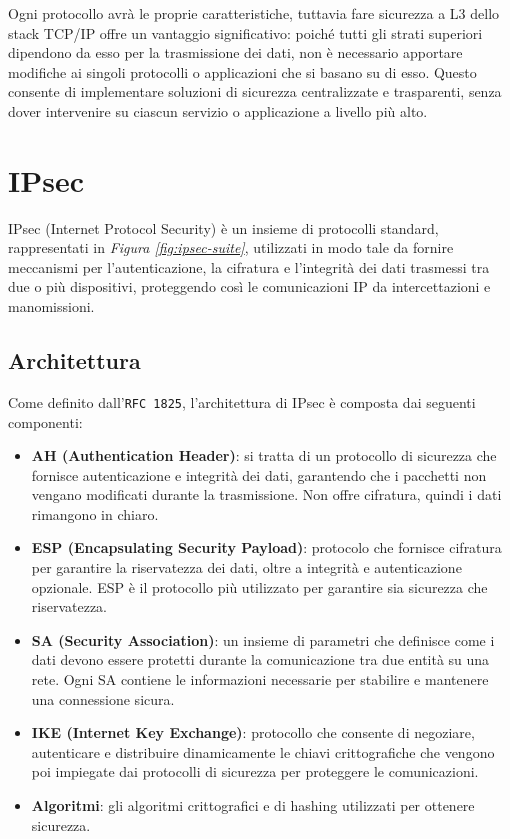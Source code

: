 \noindent
Ogni protocollo avrà le proprie caratteristiche, tuttavia fare sicurezza a L3 dello stack TCP/IP offre un vantaggio significativo:
poiché tutti gli strati superiori dipendono da esso per la trasmissione dei dati,
non è necessario apportare modifiche ai singoli protocolli o applicazioni che
si basano su di esso. Questo consente di implementare soluzioni di sicurezza
centralizzate e trasparenti, senza dover intervenire su ciascun servizio o
applicazione a livello più alto.



\section{IPsec}

IPsec (Internet Protocol Security) è un insieme di protocolli standard, rappresentati in \textit{Figura \ref{fig:ipsec-suite}}, utilizzati
in modo tale da fornire meccanismi per l'autenticazione, la cifratura e l'integrità dei dati trasmessi tra due o più
dispositivi, proteggendo così le comunicazioni IP da intercettazioni e manomissioni.

\subsection{Architettura}

Come definito dall'\texttt{RFC 1825}, l'architettura di IPsec è composta dai seguenti componenti:

\begin{itemize}
    \item \textbf{AH (Authentication Header)}: si tratta di un protocollo di sicurezza che fornisce autenticazione e integrità dei dati,
    garantendo che i pacchetti non vengano modificati durante la trasmissione. Non offre cifratura, quindi i dati rimangono in chiaro. 
    \item \textbf{ESP (Encapsulating Security Payload)}: protocolo che fornisce cifratura per garantire la riservatezza dei dati,
    oltre a integrità e autenticazione opzionale. ESP è il protocollo più utilizzato
    per garantire sia sicurezza che riservatezza.
    
    \item \textbf{SA (Security Association)}: un insieme di parametri che definisce come i dati devono essere protetti durante la comunicazione tra due entità su una rete. Ogni SA contiene le informazioni necessarie per stabilire e mantenere una connessione sicura.
    \item \textbf{IKE (Internet Key Exchange)}: protocollo che consente di negoziare, autenticare e distribuire dinamicamente le chiavi crittografiche che vengono poi impiegate dai protocolli di sicurezza per proteggere le comunicazioni.
    \item \textbf{Algoritmi}: gli algoritmi crittografici e di hashing utilizzati per ottenere sicurezza.
\end{itemize}

